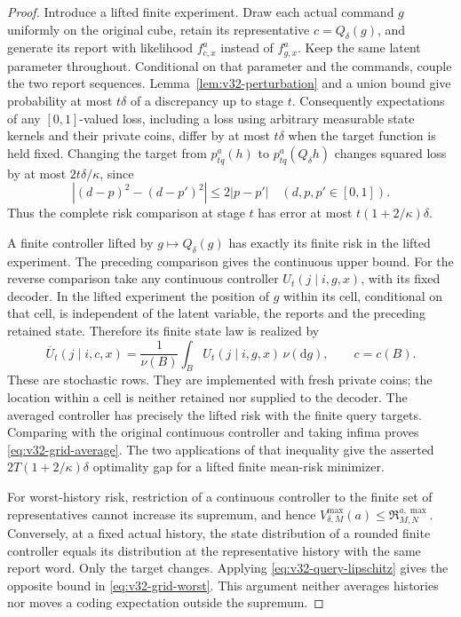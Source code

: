 \begin{proof}
Introduce a lifted finite experiment. Draw each actual command $g$
uniformly on the original cube, retain its representative $c=Q_\delta(g)$,
and generate its report with likelihood $f^a_{c,x}$ instead of
$f^a_{g,x}$. Keep the same latent parameter throughout. Conditional on
that parameter and the commands, couple the two report sequences.
Lemma~\ref{lem:v32-perturbation} and a union bound give probability at
most $t\delta$ of a discrepancy up to stage $t$. Consequently expectations
of any $[0,1]$-valued loss, including a loss using arbitrary measurable
state kernels and their private coins, differ by at most $t\delta$
when the target function is held fixed. Changing the target from
$p^a_{tq}(h)$ to $p^a_{tq}(Q_\delta h)$ changes squared loss by at most
$2t\delta/\kappa$, since
\[
 |(d-p)^2-(d-p')^2|\le2|p-p'|\quad(d,p,p'\in[0,1]).
\]
Thus the complete risk comparison at stage $t$ has error at most
$t(1+2/\kappa)\delta$.

A finite controller lifted by $g\mapsto Q_\delta(g)$ has exactly its
finite risk in the lifted experiment. The preceding comparison gives
the continuous upper bound. For the reverse comparison take any
continuous controller $U_t(j\mid i,g,x)$, with its fixed decoder.
In the lifted experiment the position of $g$ within its cell, conditional
on that cell, is independent of the latent variable, the reports and the
preceding retained state. Therefore its finite state law is realized by
\begin{equation}\label{eq:v32-cell-average}
 \overline U_t(j\mid i,c,x)=
   \frac{1}{\nu(B)}\int_B U_t(j\mid i,g,x)\,\nu(\mathrm dg),
                    \qquad c=c(B).
\end{equation}
These are stochastic rows. They are implemented with fresh private coins;
the location within a cell is neither retained nor supplied to the decoder.
The averaged controller has precisely the lifted risk with the finite
query targets. Comparing with the original continuous controller and
taking infima proves \eqref{eq:v32-grid-average}. The two applications
of that inequality give the asserted $2T(1+2/\kappa)\delta$ optimality
gap for a lifted finite mean-risk minimizer.

For worst-history risk, restriction of a continuous controller to the
finite set of representatives cannot increase its supremum, and hence
$V^{\max}_{\delta,M}(a)\le\mathfrak R_{M,N}^{a,\max}$. Conversely, at
a fixed actual history, the state distribution of a rounded finite
controller equals its distribution at the representative history with
the same report word. Only the target changes. Applying
\eqref{eq:v32-query-lipschitz} gives the opposite bound in
\eqref{eq:v32-grid-worst}. This argument neither averages histories nor
moves a coding expectation outside the supremum.
\end{proof}


